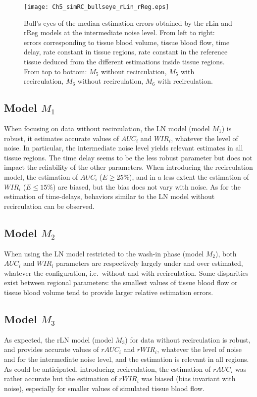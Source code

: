 \begin{figure}
\center
\texttt{[image: Ch5\_simRC\_bullseye\_rLin\_rReg.eps]}
\vspace{-5mm}
\caption{Bull's-eyes of the median estimation errors obtained by the rLin and rReg models at the intermediate noise level. From left to right: errors corresponding to tissue blood volume, tissue blood flow, time delay, rate constant in tissue regions, rate constant in the reference tissue deduced from the different estimations inside tissue regions. From top to bottom: $M_5$ without recirculation, $M_5$ with recirculation, $M_6$ without recirculation, $M_6$ with recirculation.}
\label{fig:be-rLinReg}
\vspace{-3mm}
\end{figure}

\subsection{Model $M_1$}
When focusing on data without recirculation, the LN model (model $M_1$) is robust, it estimates accurate values of $AUC_i$ and $WIR_i$, whatever the level of noise. In particular, the intermediate noise level yields relevant estimates in all tissue regions. The time delay seems to be the less robust parameter but does not impact the reliability of the other parameters.
When introducing the recirculation model, the estimation of $AUC_i$ ($E \geq 25\%$), and in a less extent the estimation of $WIR_i$ ($E \leq 15\%$) are biased, but the bias does not vary with noise. As for the estimation of time-delays, behaviors similar to the LN model without recirculation can be observed.

\subsection{Model $M_2$}
When using the LN model restricted to the wash-in phase (model $M_2$), both $AUC_i$ and $WIR_i$ parameters are respectively largely under and over estimated, whatever the configuration, i.e.~without and with recirculation. Some disparities exist between regional parameters: the smallest values of tissue blood flow or tissue blood volume tend to provide larger relative estimation errors.

\subsection{Model $M_3$}
As expected, the rLN model (model $M_3$) for data without recirculation is robust, and provides accurate values of $rAUC_i$ and $rWIR_i$, whatever the level of noise and for the intermediate noise level, and the estimation is relevant in all regions. As could be anticipated, introducing recirculation, the estimation of $rAUC_i$ was rather accurate but the estimation of $rWIR_i$ was biased (bias invariant with noise), especially for smaller values of simulated tissue blood flow.

